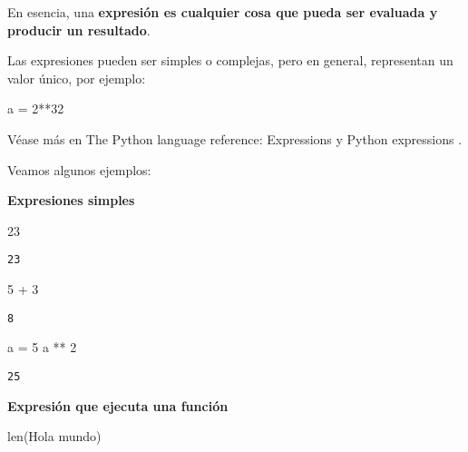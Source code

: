 \documentclass[
  letterpaper,
  DIV=11,
  numbers=noendperiod]{scrreprt}
\newenvironment{Shaded}{\begin{snugshade}}{\end{snugshade}}
\newcommand{\BuiltInTok}[1]{\textcolor[rgb]{0.00,0.23,0.31}{#1}}
\newcommand{\DecValTok}[1]{\textcolor[rgb]{0.68,0.00,0.00}{#1}}
\newcommand{\NormalTok}[1]{\textcolor[rgb]{0.00,0.23,0.31}{#1}}
\newcommand{\OperatorTok}[1]{\textcolor[rgb]{0.37,0.37,0.37}{#1}}
\newcommand{\StringTok}[1]{\textcolor[rgb]{0.13,0.47,0.30}{#1}}
\begin{document}
En esencia, una \textbf{expresión es cualquier cosa que pueda ser
evaluada y producir un resultado}.

Las expresiones pueden ser simples o complejas, pero en general,
representan un valor único, por ejemplo:

\begin{Shaded}
\begin{Highlighting}[]
\NormalTok{a }\OperatorTok{=} \DecValTok{2}\OperatorTok{**}\DecValTok{32}
\end{Highlighting}
\end{Shaded}

Véase más en The Python language reference: Expressions y Python
expressions .

Veamos algunos ejemplos:

\textbf{Expresiones simples}

\begin{Shaded}
\begin{Highlighting}[]
\DecValTok{23} 
\end{Highlighting}
\end{Shaded}

\begin{verbatim}
23
\end{verbatim}

\begin{Shaded}
\begin{Highlighting}[]
\DecValTok{5} \OperatorTok{+} \DecValTok{3}
\end{Highlighting}
\end{Shaded}

\begin{verbatim}
8
\end{verbatim}

\begin{Shaded}
\begin{Highlighting}[]
\NormalTok{a }\OperatorTok{=} \DecValTok{5}
\NormalTok{a }\OperatorTok{**} \DecValTok{2}
\end{Highlighting}
\end{Shaded}

\begin{verbatim}
25
\end{verbatim}

\textbf{Expresión que ejecuta una función}

\begin{Shaded}
\begin{Highlighting}[]
\BuiltInTok{len}\NormalTok{(}\StringTok{\textquotesingle{}Hola mundo\textquotesingle{}}\NormalTok{) }
\end{Highlighting}
\end{Shaded}
\end{document}
